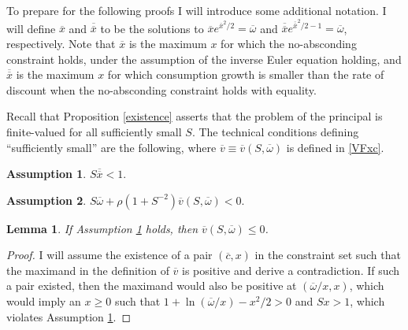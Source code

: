 \documentclass[11pt]{article}
\theoremstyle{plain}
\newtheorem{lemma}[thm]{Lemma}
\theoremstyle{definition} %
\newtheorem{assump}{Assumption}[section]
\begin{document}
To prepare for the following proofs I will introduce some additional notation. I will define $\overline{x}$ and $\overline{\overline{x}}$ to be the solutions to $\overline{x}e^{\overline{x}^2/2} = \overline{\omega}$ and $\overline{\overline{x}}e^{\overline{\overline{x}}^2/2-1} = \overline{\omega}$, respectively. Note that $\overline{x}$ is the maximum $x$ for which the no-absconding constraint holds, under the assumption of the inverse Euler equation holding, and $\overline{\overline{x}}$ is the maximum $x$ for which consumption growth is smaller than the rate of discount when the no-absconding constraint holds with equality. 

Recall that Proposition \ref{existence} asserts that the problem of the principal is finite-valued for all sufficiently small $S$. The technical conditions defining ``sufficiently small'' are the following, where $\overline{v} \equiv \overline{v}(S, \overline{\omega})$ is defined in \eqref{VFxc}. 

\begin{assump}\label{ASSsuff}
$S\overline{\overline{x}}<1$. 
\end{assump}

\begin{assump}\label{ASSsuff2}
$S\overline{\omega} + \rho(1 + S^{-2})\overline{v}(S, \overline{\omega}) < 0$.
\end{assump}

\begin{lemma} \label{vneg}
If Assumption \ref{ASSsuff} holds, then $\overline{v}(S, \overline{\omega}) \leq 0$. 
\end{lemma}

\begin{proof}
I will assume the existence of a pair $(\overline{c}, x)$ in the constraint set such that the maximand in the definition of $\overline{v}$ is positive and derive a contradiction. If such a pair existed, then the maximand would also be positive at $(\overline{\omega}/x, x)$, which would imply an $x \geq0$ such that $1 + \ln (\overline{\omega}/x) - x^2/2 > 0$ and $Sx > 1$, which violates Assumption \ref{ASSsuff}. 
\end{proof}
\end{document}
